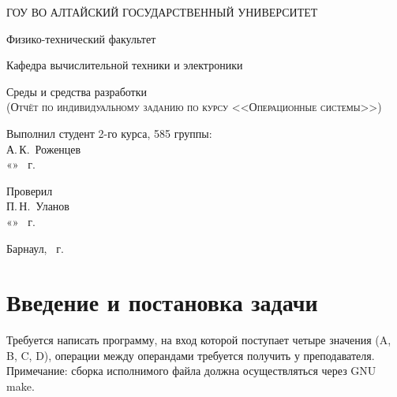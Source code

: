 \documentclass[a4paper,14pt]{extarticle}
\begin{document}
\begin{titlepage}
  \begin{center}
    ГОУ ВО АЛТАЙСКИЙ ГОСУДАРСТВЕННЫЙ УНИВЕРСИТЕТ
    \vspace{0.25cm}
    
    Физико-технический факультет
    
    Кафедра вычислительной техники и электроники
    \vfill
    
    {\LARGE Среды и средства разработки}\\[5mm]
    \textsc{(Отчёт по индивидуальному заданию по курсу <<Операционные системы>>)}
  \bigskip

\end{center}
\vfill

\newlength{\ML}
\hfill\begin{minipage}{0.4\textwidth}
  Выполнил студент 2-го курса, 585 группы:\\
  \underline{\hspace{\ML}} А.\,К.~Роженцев\\
  «\underline{\hspace{0.7cm}}» \underline{\hspace{2cm}} \the\year~г.
\end{minipage}%
\bigskip

\hfill\begin{minipage}{0.4\textwidth}
  Проверил\\
  \underline{\hspace{\ML}} П.\,Н.~Уланов\\
  «\underline{\hspace{0.7cm}}» \underline{\hspace{2cm}} \the\year~г.
\end{minipage}%
\vfill

\begin{center}
  Барнаул, \the\year~г.
\end{center}
\end{titlepage}


\tableofcontents

\section{Введение и постановка задачи}
Требуется написать программу, на вход которой поступает четыре значения (A, B, C, D), операции между операндами
требуется получить у преподавателя. Примечание: сборка исполнимого файла должна осуществляться через GNU make.
\end{document}
